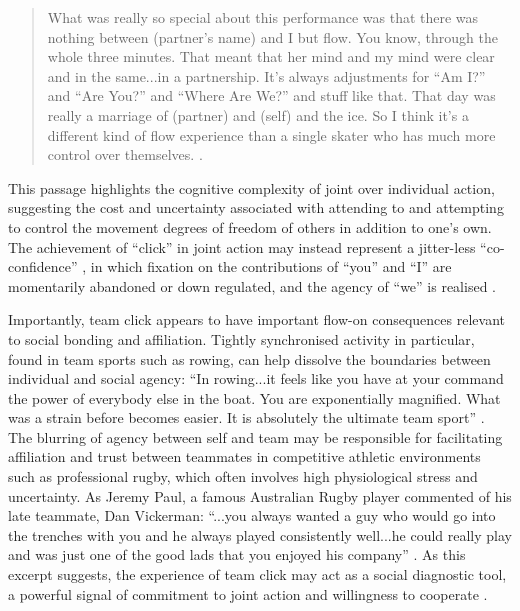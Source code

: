 \begin{CJK}{UTF8}{gbsn}
    \begin{quote}
      What was really so special about this performance was that there was nothing between (partner's name) and I but flow.  You know, through the whole three minutes.  That meant that her mind and my mind were clear and in the same...in a partnership. It's always adjustments for ``Am I?'' and ``Are You?'' and ``Where Are We?'' and stuff like that.  That day was really a marriage of (partner) and (self) and the ice.  So I think it's a different kind of flow experience than a single skater who has much more control over themselves. \citep[173-4]{Jackson1992}.
    \end{quote}

This passage highlights the cognitive complexity of joint over individual action, suggesting the cost and uncertainty associated with attending to and attempting to control the movement degrees of freedom of others in addition to one's own.  The achievement of ``click'' in joint action may instead represent a jitter-less ``co-confidence'' \citep{Noy2015,Noy2017}, in which fixation on the contributions of ``you'' and ``I'' are momentarily abandoned or down regulated, and the agency of ``we'' is realised \citep{Gallotti2013,Friston2015}.


Importantly, team click appears to have important flow-on consequences relevant to social bonding and affiliation. Tightly synchronised activity in particular, found in team sports such as rowing, can help dissolve the boundaries between individual and social agency: ``In rowing...it feels like you have at your command the power of everybody else in the boat. You are exponentially magnified. What was a strain before becomes easier. It is absolutely the ultimate team sport'' \citep[x]{Brown2016}.
The blurring of agency between self and team may be responsible for facilitating affiliation and trust between teammates in competitive athletic environments such as professional rugby, which often involves high physiological stress and uncertainty.  As Jeremy Paul, a famous Australian Rugby player commented of his late teammate, Dan Vickerman: ``...you always wanted a guy who would go into the trenches with you and he always played consistently well...he could really play and was just one of the good lads that you enjoyed his company'' \citep{Fox-Sports2017}.  As this excerpt suggests, the experience of team click may act as a social diagnostic tool, a powerful signal of commitment to joint action and willingness to cooperate \citep{Reddish2013a}. \\


\end{CJK}
